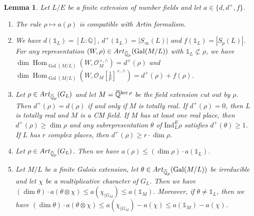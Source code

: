 \documentclass[12pt]{amsart}
\newcommand{\Q}{\mathbb{Q}}
\newcommand\bQ{\mathbb{Q}}
\newcommand\cO{\mathcal{O}}
\newcommand{\ob}[1]{\mkern 1.5mu\overline{\mkern-1.5mu#1\mkern-1.5mu}\mkern 1.5mu}
\newcommand{\Ind}{\mathrm{Ind}}
\newcommand{\Art}{\textrm{Art}}
\DeclareMathOperator{\Gal}{Gal}
\DeclareMathOperator{\Hom}{Hom}
\theoremstyle{defstyle}
\theoremstyle{thmstyle}
\newtheorem{lemme}[subsubsection]{Lemma}
\begin{document}
	\begin{lemme}\label{lem:properties_invariants_d_d+_and_f}
		Let $L/E$ be a finite extension of number fields and let $a\in \{d,d^+,f\}$.
		\begin{enumerate}
			\item The rule $\rho \mapsto a(\rho)$ is compatible with Artin formalism.
			\item We have $d(\mathds{1}_L)=[L:\Q]$, $d^+(\mathds{1}_L)=|S_\infty(L)|$ and $f(\mathds{1}_L)=|S_p(L)|$. For any representation $(W,\rho)\in \Art_{\ob{\bQ}_p}(\Gal(M/L))$ with $\mathds{1}_L \not\subset \rho$, we have $\dim \Hom_{\Gal(M/L)}(W,\cO_M^{\times,\wedge})=d^+(\rho)$ and  $\dim \Hom_{\Gal(M/L)}(W,\cO_M[\tfrac{1}{p}]^{\times,\wedge})=d^+(\rho)+f(\rho)$.
			\item Let $\rho\in \Art_{\ob{\bQ}_p}(G_L)$ and let $M=\ob{\Q}^{\ker\rho}$ be the field extension cut out by $\rho$. Then $d^+(\rho)=d(\rho)$ if and only if $M$ is totally real. If $d^+(\rho)=0$, then $L$ is totally real and $M$ is a CM field. If $M$ has at least one real place, then $d^+(\rho) \geq \dim \rho$ and any subrepresentation $\theta$ of $\Ind_L^E \rho$ satisfies $d^+(\theta)\geq 1$. If $L$ has $r$ complex places, then $d^+(\rho)\geq r\cdot \dim \rho$.
			\item Let $\rho\in \Art_{\ob{\bQ}_p}(G_L)$. Then we have $a(\rho)\leq (\dim \rho)\cdot a(\mathds{1}_L)$. 
			\item Let $M/L$ be a finite Galois extension, let $\theta\in \Art_{\ob{\bQ}_p}(\Gal(M/L))$ be irreducible and let $\chi$ be a multiplicative character of $G_L$. Then we have $(\dim\theta)\cdot a(\theta \otimes \chi) \leq a(\chi_{|G_M})\leq a(\mathds{1}_M)$. Moreover, if $\theta\neq \mathds{1}_L$, then we have $(\dim\theta)\cdot a(\theta \otimes \chi) \leq a(\chi_{|G_M})-a(\chi)\leq a(\mathds{1}_M)-a(\chi)$.
		\end{enumerate}
	\end{lemme}
\end{document}
